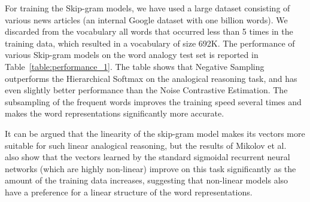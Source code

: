 \documentclass{article}
\begin{document}
For training the Skip-gram models, we have used a large dataset
consisting of various news articles (an internal Google dataset with one billion words).
We discarded from the vocabulary all words that occurred
less than 5 times in the training data, which resulted in a vocabulary of size 692K.
The performance of various Skip-gram models on the word
analogy test set is reported in Table~\ref{table:performance_1}.
The table shows that Negative Sampling
outperforms the Hierarchical Softmax on the analogical
reasoning task, and has even slightly better performance than the Noise Contrastive Estimation.
The subsampling of the frequent words improves the training speed several times
and makes the word representations significantly more accurate.


It can be argued that the linearity of the skip-gram model makes its vectors
more suitable for such linear analogical reasoning, but the results of
Mikolov et al.~\cite{mikolov} also show that the vectors learned by the
standard sigmoidal recurrent neural networks (which are highly non-linear)
improve on this task significantly as the amount of the training data increases,
suggesting that non-linear models also have a preference for a linear
structure of the word representations.
\end{document}
